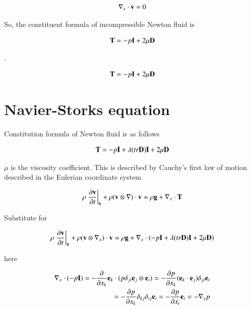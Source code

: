 \begin{eqnarray}
\nabla_x \cdot {\mathbf{v}} = 0
\end{eqnarray}

So, the constituent formula of incompressible Newton fluid is

\begin{eqnarray}
{\mathbf{T}} = -p{\mathbf{I}} + 2\mu{\mathbf{D}}
\end{eqnarray}

.

\begin{tcolorbox}[title=constituent formula of incompressible Newton fluid]
\begin{eqnarray}
{\mathbf{T}} = -p{\mathbf{I}} + 2\mu{\mathbf{D}}
\end{eqnarray}
\end{tcolorbox}


\section{Navier-Storks equation}

Constitution formula of Newton fluid is as follows

\begin{eqnarray}
{\mathbf{T}}=-p{\mathbf{I}}+\lambda(tr{\mathbf{D}}){\mathbf{I}}+ 2 \mu {\mathbf{D}}
\end{eqnarray}

$\mu$ is the viscosity coefficient. This is described by Cauchy's first law of motion described in the Eulerian coordinate system

\begin{eqnarray}
\rho\left. \frac{\partial \mathbf{v}}{\partial t} \right|_{\mathbf{x}}+\rho({\mathbf{v}} \otimes \nabla ) \cdot {\mathbf{v}}=\rho {\mathbf{g}}+ \nabla_x \cdot {\mathbf{T}}
\end{eqnarray}

Substitute for

\begin{eqnarray}
\rho\left. \frac{\partial \mathbf{v}}{\partial t} \right|_{\mathbf{x}}+\rho({\mathbf{v}} \otimes \nabla_x ) \cdot {\mathbf{v}}=\rho {\mathbf{g}}+ \nabla_x \cdot (-p{\mathbf{I}}+\lambda(tr{\mathbf{D}}){\mathbf{I}}+2\mu{\mathbf{D}})
\end{eqnarray}

here

\begin{eqnarray}
\nabla_x \cdot (-p{\mathbf{I}})  =  -\frac{\partial}{\partial x_k}{\mathbf{e}}_k\cdot( p \delta_{ji}{\mathbf{e}}_j \otimes {\mathbf{e}}_i )  =  -\frac{\partial p}{\partial x_k}({\mathbf{e}}_k \cdot {\mathbf{e}}_j )\delta_{ji}{\mathbf{e}}_i \\			=  -\frac{\partial p}{\partial x_k}\delta_{kj}\delta_{ij}{\mathbf{e}}_i  =  -\frac{\partial p}{\partial x_i}{\mathbf{e}}_i						=  -\nabla_x p
\end{eqnarray}

